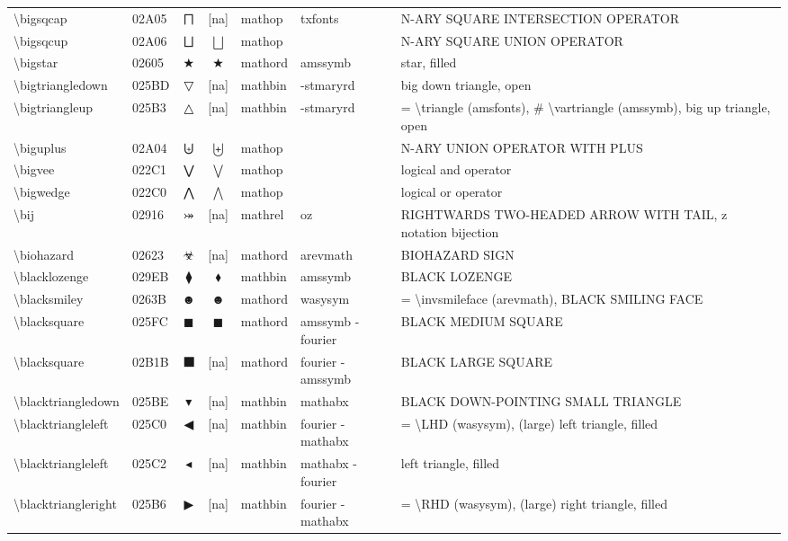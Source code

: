 \documentclass[a4paper,landscape]{article}
\begin{document}
\begin{longtable}{llcclll}
\textbackslash{}bigsqcap & 02A05 & ⨅ & [na] & mathop & txfonts & N-ARY SQUARE INTERSECTION OPERATOR \\
\textbackslash{}bigsqcup & 02A06 & ⨆ & $\bigsqcup$ & mathop &  & N-ARY SQUARE UNION OPERATOR \\
\textbackslash{}bigstar & 02605 & ★ & $\bigstar$ & mathord & amssymb & star, filled \\
\textbackslash{}bigtriangledown & 025BD & ▽ & [na] & mathbin & -stmaryrd & big down triangle, open \\
\textbackslash{}bigtriangleup & 025B3 & △ & [na] & mathbin & -stmaryrd & = \textbackslash{}triangle (amsfonts), \# \textbackslash{}vartriangle (amssymb), big up triangle, open \\
\textbackslash{}biguplus & 02A04 & ⨄ & $\biguplus$ & mathop &  & N-ARY UNION OPERATOR WITH PLUS \\
\textbackslash{}bigvee & 022C1 & ⋁ & $\bigvee$ & mathop &  & logical and operator \\
\textbackslash{}bigwedge & 022C0 & ⋀ & $\bigwedge$ & mathop &  & logical or operator \\
\textbackslash{}bij & 02916 & ⤖ & [na] & mathrel & oz & RIGHTWARDS TWO-HEADED ARROW WITH TAIL, z notation bijection \\
\textbackslash{}biohazard & 02623 & ☣ & [na] & mathord & arevmath & BIOHAZARD SIGN \\
\textbackslash{}blacklozenge & 029EB & ⧫ & $\blacklozenge$ & mathbin & amssymb & BLACK LOZENGE \\
\textbackslash{}blacksmiley & 0263B & ☻ & $\blacksmiley$ & mathord & wasysym & = \textbackslash{}invsmileface (arevmath), BLACK SMILING FACE \\
\textbackslash{}blacksquare & 025FC & ◼ & $\blacksquare$ & mathord & amssymb -fourier & BLACK MEDIUM SQUARE \\
\textbackslash{}blacksquare & 02B1B & ⬛ & [na] & mathord & fourier -amssymb & BLACK LARGE SQUARE \\
\textbackslash{}blacktriangledown & 025BE & ▾ & [na] & mathbin & mathabx & BLACK DOWN-POINTING SMALL TRIANGLE \\
\textbackslash{}blacktriangleleft & 025C0 & ◀ & [na] & mathbin & fourier -mathabx & = \textbackslash{}LHD (wasysym),  (large) left triangle,  filled \\
\textbackslash{}blacktriangleleft & 025C2 & ◂ & [na] & mathbin & mathabx -fourier & left triangle, filled \\
\textbackslash{}blacktriangleright & 025B6 & ▶ & [na] & mathbin & fourier -mathabx & = \textbackslash{}RHD (wasysym),  (large) right triangle,  filled \\

\end{longtable}
\end{document}
